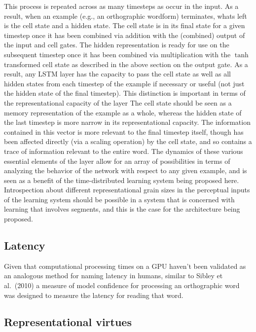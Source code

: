 \documentclass[
  american,
  man,floatsintext]{apa6}
\begin{document}
This process is repeated across as many timesteps as occur in the input. As a result, when an example (e.g., an orthographic wordform) terminates, whats left is the cell state and a hidden state. The cell state is in its final state for a given timestep once it has been combined via addition with the (combined) output of the input and cell gates. The hidden representation is ready for use on the subsequent timestep once it has been combined via multiplication with the \(\tanh\) transformed cell state as described in the above section on the output gate. As a result, any LSTM layer has the capacity to pass the cell state as well as all hidden states from each timestep of the example if necessary or useful (not just the hidden state of the final timestep). This distinction is important in terms of the representational capacity of the layer The cell state should be seen as a memory representation of the example as a whole, whereas the hidden state of the last timestep is more narrow in its representational capacity. The information contained in this vector is more relevant to the final timestep itself, though has been affected directly (via a scaling operation) by the cell state, and so contains a trace of information relevant to the entire word. The dynamics of these various essential elements of the layer allow for an array of possibilities in terms of analyzing the behavior of the network with respect to any given example, and is seen as a benefit of the time-distributed learning system being proposed here. Introspection about different representational grain sizes in the perceptual inputs of the learning system should be possible in a system that is concerned with learning that involves segments, and this is the case for the architecture being proposed.

\hypertarget{latency}{%
\subsection{Latency}\label{latency}}

Given that computational processing times on a GPU haven't been validated as an analogous method for naming latency in humans, similar to Sibley et al.~(2010) a measure of model confidence for processing an orthographic word was designed to measure the latency for reading that word.

\hypertarget{representational-virtues}{%
\subsection{Representational virtues}\label{representational-virtues}}
\end{document}
